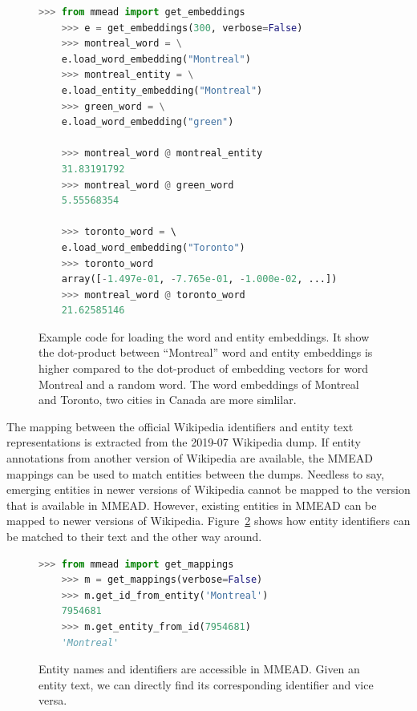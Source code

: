 
\begin{figure}[!t]
\begin{lstlisting}[language=python]
	>>> from mmead import get_embeddings
	>>> e = get_embeddings(300, verbose=False)
	>>> montreal_word = \
	e.load_word_embedding("Montreal")
	>>> montreal_entity = \
	e.load_entity_embedding("Montreal")
	>>> green_word = \
	e.load_word_embedding("green")
	
	>>> montreal_word @ montreal_entity
	31.83191792
	>>> montreal_word @ green_word
	5.55568354
	
	>>> toronto_word = \ 
	e.load_word_embedding("Toronto")
	>>> toronto_word
	array([-1.497e-01, -7.765e-01, -1.000e-02, ...])
	>>> montreal_word @ toronto_word
	21.62585146
\end{lstlisting}
\caption{Example code for loading the word and entity embeddings. It show the dot-product between ``Montreal'' word and entity embeddings is higher compared to the dot-product of embedding vectors for word Montreal and a random word. The word embeddings of Montreal and Toronto, two cities in Canada are more simlilar.}
\label{fig:dot-product}
\end{figure}

The mapping between the official Wikipedia identifiers and entity text representations is extracted from the 2019-07 Wikipedia dump. If entity annotations from another version of Wikipedia are available, the MMEAD mappings can be used to match entities between the dumps. 
Needless to say, emerging entities in newer versions of Wikipedia cannot be mapped to the version that is available in MMEAD. However, existing entities in MMEAD can be mapped to newer versions of Wikipedia.
Figure~\ref{fig:load_mappings} shows how entity identifiers can be matched to their text and the other way around.  

\begin{figure}[!t]
\begin{lstlisting}[language=python]
	>>> from mmead import get_mappings
	>>> m = get_mappings(verbose=False)
	>>> m.get_id_from_entity('Montreal')
	7954681
	>>> m.get_entity_from_id(7954681)
	'Montreal'
\end{lstlisting}
\caption{Entity names and identifiers are accessible in MMEAD. Given an entity text, we can directly find its corresponding identifier and vice versa.}
\label{fig:load_mappings}
\end{figure}

